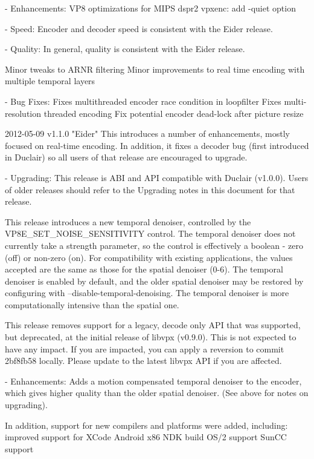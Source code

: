 \begin{DoxyVerbInclude}
  - Enhancements:
      VP8 optimizations for MIPS dspr2
      vpxenc: add -quiet option

  - Speed:
      Encoder and decoder speed is consistent with the Eider release.

  - Quality:
      In general, quality is consistent with the Eider release.

      Minor tweaks to ARNR filtering
      Minor improvements to real time encoding with multiple temporal layers

  - Bug Fixes:
      Fixes multithreaded encoder race condition in loopfilter
      Fixes multi-resolution threaded encoding
      Fix potential encoder dead-lock after picture resize


2012-05-09 v1.1.0 "Eider"
  This introduces a number of enhancements, mostly focused on real-time
  encoding. In addition, it fixes a decoder bug (first introduced in
  Duclair) so all users of that release are encouraged to upgrade.

  - Upgrading:
    This release is ABI and API compatible with Duclair (v1.0.0). Users
    of older releases should refer to the Upgrading notes in this
    document for that release.

    This release introduces a new temporal denoiser, controlled by the
    VP8E_SET_NOISE_SENSITIVITY control. The temporal denoiser does not
    currently take a strength parameter, so the control is effectively
    a boolean - zero (off) or non-zero (on). For compatibility with
    existing applications, the values accepted are the same as those
    for the spatial denoiser (0-6). The temporal denoiser is enabled
    by default, and the older spatial denoiser may be restored by
    configuring with --disable-temporal-denoising. The temporal denoiser
    is more computationally intensive than the spatial one.

    This release removes support for a legacy, decode only API that was
    supported, but deprecated, at the initial release of libvpx
    (v0.9.0). This is not expected to have any impact. If you are
    impacted, you can apply a reversion to commit 2bf8fb58 locally.
    Please update to the latest libvpx API if you are affected.

  - Enhancements:
      Adds a motion compensated temporal denoiser to the encoder, which
      gives higher quality than the older spatial denoiser. (See above
      for notes on upgrading).

      In addition, support for new compilers and platforms were added,
      including:
        improved support for XCode
        Android x86 NDK build
        OS/2 support
        SunCC support


\end{DoxyVerbInclude}
